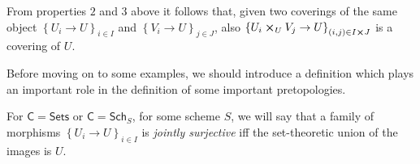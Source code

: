 \begin{rem}[]
	From properties $2$ and $3$ above it follows that, given 
	two coverings of the same object $\left\{ U_{ i } \to U \right\}_{ i \in I }$
	and $\left\{ V_{ i } \to U \right\}_{ j \in J }$, also
	$\left\{ U_{ i } \cross_U V_j \to U \right\}_{ (i,j) \in I \cross J }$
	is a covering of $U$.
\end{rem}


\noindent
Before moving on to some examples, we should introduce a
definition which plays an important role in the definition of
some important pretopologies.
\begin{defn}
	For $\mathsf{C} = \mathsf{Sets}$ or $\mathsf{C} = \mathsf{Sch}_{ S }$, for some scheme $S$,
	we will say that a family of morphisms
	$\left\{ U_{ i } \to U \right\}_{ i \in I }$ is {\em jointly surjective} iff
	the set-theoretic union of the images is $U$.
\end{defn}


